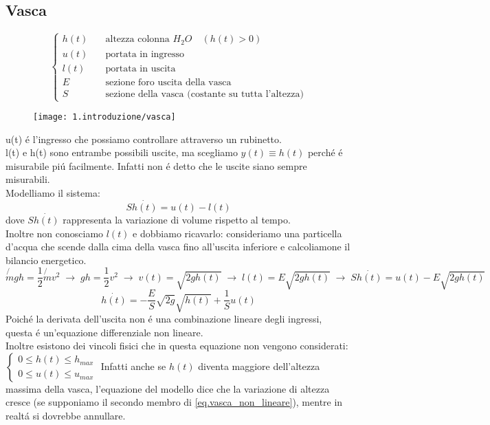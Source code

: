 \documentclass[../main.tex]{subfiles}
\begin{document}
	\subsection{Vasca}
		\[
			\begin{cases}
				h(t) & \quad \text{altezza colonna $H_{2}O$} \quad (h(t)>0)\\
				u(t) & \quad \text{portata in ingresso}\\
				l(t) & \quad \text{portata in uscita}\\
				E & \quad \text{sezione foro uscita della vasca}\\
				S & \quad \text{sezione della vasca (costante su tutta l'altezza)}
			\end{cases}
		\]
		\begin{figure}[h!]
			\centering
			\texttt{[image: 1.introduzione/vasca]}
		\end{figure}
		u(t) \'e l'ingresso che possiamo controllare attraverso un rubinetto.\\
		l(t) e h(t) sono entrambe possibili uscite, ma scegliamo $y(t) \equiv h(t)$ perch\'e \'e misurabile pi\'u facilmente. Infatti non \'e detto che le uscite siano sempre misurabili.\\
		Modelliamo il sistema:
		\begin{equation}
			S \dot{h(t)} = u(t) - l(t)
		\end{equation}
		dove $S \dot{h(t)}$ rappresenta la variazione di volume rispetto al tempo.\\
		Inoltre non conosciamo $l(t)$ e dobbiamo ricavarlo: consideriamo una particella d'acqua che scende dalla cima della vasca fino all'uscita inferiore e calcoliamone il bilancio energetico.
		\[
			\not{m} gh = \frac{1}{2} \not{m} v^2 \; \rightarrow \;
			gh = \frac{1}{2} v^2 \; \rightarrow \;
			v(t) = \sqrt{2gh(t)} \; \rightarrow \;
			l(t) = E \sqrt{2gh(t)} \; \rightarrow \;
			S \dot{h(t)} = u(t) - E \sqrt{2gh(t)}
		\]
		\begin{equation} \label{eq.vasca_non_lineare}
			\dot{h(t)} = - \frac{E}{S} \sqrt{2g} \sqrt{h(t)} + \frac{1}{S} u(t)
		\end{equation}
		Poich\'e la derivata dell'uscita non \'e una combinazione lineare degli ingressi, questa \'e un'equazione differenziale non lineare.\\
		Inoltre esistono dei vincoli fisici che in questa equazione non vengono considerati: 
		\(
			\begin{cases}
				0 \leq h(t) \leq h_{max}\\
				0 \leq u(t) \leq u_{max}
			\end{cases}
		\)
		Infatti anche se $h(t)$ diventa maggiore dell'altezza massima della vasca, l'equazione del modello dice che la variazione di altezza cresce (se supponiamo il secondo membro di \ref{eq.vasca_non_lineare}), mentre in realt\'a si dovrebbe annullare.
		
\end{document}
